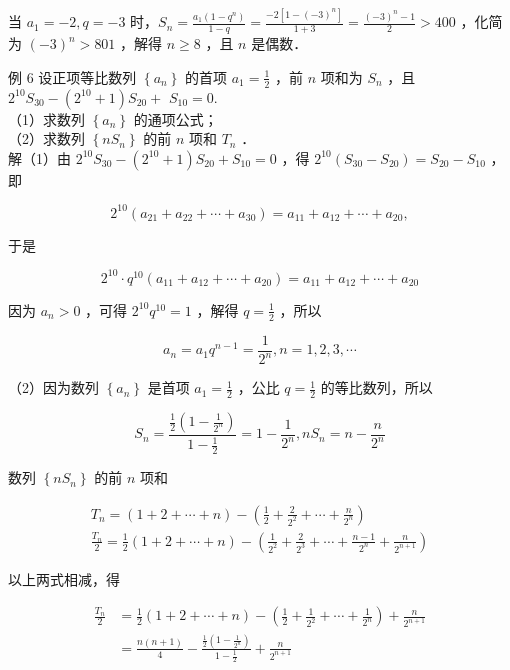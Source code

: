 \documentclass[10pt]{article}
\begin{document}
当 \(a_{1}=-2, q=-3\) 时，\(S_{n}=\frac{a_{1}\left(1-q^{n}\right)}{1-q}=\frac{-2\left[1-(-3)^{n}\right]}{1+3}=\frac{(-3)^{n}-1}{2}>400\) ，化简为 \((-3)^{n}>801\) ，解得 \(n \geqslant 8\) ，且 \(n\) 是偶数．

例 6 设正项等比数列 \(\left\{a_{n}\right\}\) 的首项 \(a_{1}=\frac{1}{2}\) ，前 \(n\) 项和为 \(S_{n}\) ，且 \(2^{10} S_{30}-\left(2^{10}+1\right) S_{20}+\) \(S_{10}=0\).\\
（1）求数列 \(\left\{a_{n}\right\}\) 的通项公式；\\
（2）求数列 \(\left\{n S_{n}\right\}\) 的前 \(n\) 项和 \(T_{n}\) ．\\
解（1）由 \(2^{10} S_{30}-\left(2^{10}+1\right) S_{20}+S_{10}=0\) ，得 \(2^{10}\left(S_{30}-S_{20}\right)=S_{20}-S_{10}\) ，即

\[
2^{10}\left(a_{21}+a_{22}+\cdots+a_{30}\right)=a_{11}+a_{12}+\cdots+a_{20},
\]

于是

\[
2^{10} \cdot q^{10}\left(a_{11}+a_{12}+\cdots+a_{20}\right)=a_{11}+a_{12}+\cdots+a_{20}
\]

因为 \(a_{n}>0\) ，可得 \(2^{10} q^{10}=1\) ，解得 \(q=\frac{1}{2}\) ，所以

\[
a_{n}=a_{1} q^{n-1}=\frac{1}{2^{n}}, n=1,2,3, \cdots
\]

（2）因为数列 \(\left\{a_{n}\right\}\) 是首项 \(a_{1}=\frac{1}{2}\) ，公比 \(q=\frac{1}{2}\) 的等比数列，所以

\[
S_{n}=\frac{\frac{1}{2}\left(1-\frac{1}{2^{n}}\right)}{1-\frac{1}{2}}=1-\frac{1}{2^{n}}, n S_{n}=n-\frac{n}{2^{n}}
\]

数列 \(\left\{n S_{n}\right\}\) 的前 \(n\) 项和

\[
\begin{gathered}
T_{n}=(1+2+\cdots+n)-\left(\frac{1}{2}+\frac{2}{2^{2}}+\cdots+\frac{n}{2^{n}}\right) \\
\frac{T_{n}}{2}=\frac{1}{2}(1+2+\cdots+n)-\left(\frac{1}{2^{2}}+\frac{2}{2^{3}}+\cdots+\frac{n-1}{2^{n}}+\frac{n}{2^{n+1}}\right)
\end{gathered}
\]

以上两式相减，得

\[
\begin{aligned}
\frac{T_{n}}{2} & =\frac{1}{2}(1+2+\cdots+n)-\left(\frac{1}{2}+\frac{1}{2^{2}}+\cdots+\frac{1}{2^{n}}\right)+\frac{n}{2^{n+1}} \\
& =\frac{n(n+1)}{4}-\frac{\frac{1}{2}\left(1-\frac{1}{2^{n}}\right)}{1-\frac{1}{2}}+\frac{n}{2^{n+1}}
\end{aligned}
\]
\end{document}
